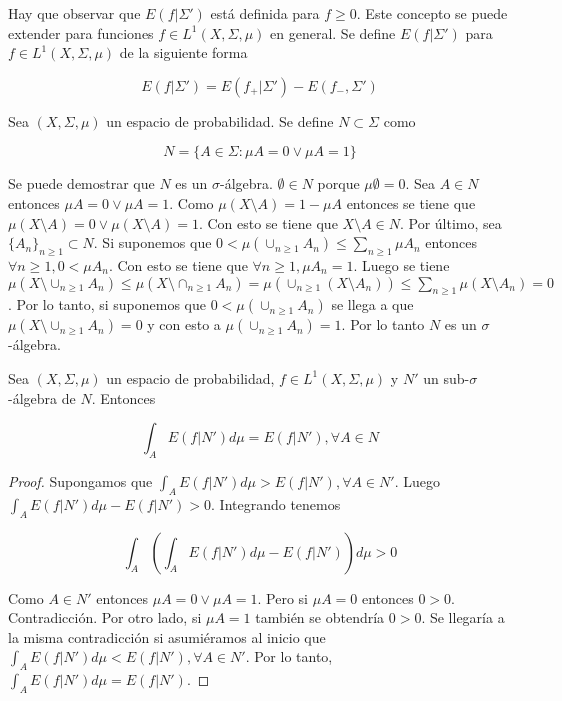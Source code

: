Hay que observar que $E(f|\Sigma')$ está definida para $f \geq 0$. Este concepto se puede extender para funciones $f \in L^1(X,\Sigma,\mu)$ en general. Se define $E(f|\Sigma')$ para $f \in L^1(X,\Sigma,\mu)$ de la siguiente forma

\begin{equation}
	E(f|\Sigma') = E(f_+|\Sigma')- E(f_-,\Sigma')
\end{equation}

\begin{definicion}\label{trivial_sigma-algebra}
	Sea $(X,\Sigma,\mu)$ un espacio de probabilidad. Se define $N \subset \Sigma$ como
	
	\begin{equation}
	N = \{ A \in \Sigma: \mu A = 0 \vee \mu A = 1 \}
	\end{equation}
\end{definicion}

Se puede demostrar que $N$ es un $\sigma$-álgebra. $\emptyset \in N$ porque $\mu \emptyset = 0$. Sea $A \in N$ entonces $\mu A = 0 \vee \mu A = 1$. Como $\mu(X \setminus A) = 1 - \mu A$ entonces se tiene que $\mu(X \setminus A) = 0 \vee \mu(X \setminus A) = 1$. Con esto se tiene que $X \setminus A \in N$. Por último, sea $\{A_n\}_{n \geq 1} \subset N$.  Si suponemos que $0 < \mu(\cup_{n \geq 1} A_n) \leq \sum_{n \geq 1} \mu A_n$ entonces $\forall n \geq 1, 0 < \mu A_n$. Con esto se tiene que $\forall n \geq 1, \mu A_n = 1$. Luego se tiene $\mu(X \setminus \cup_{n \geq 1} A_n) \leq \mu(X \setminus \cap_{n \geq 1} A_n) = \mu(\cup_{n \geq 1} (X \setminus A_n)) \leq \sum_{n \geq 1} \mu(X \setminus A_n) = 0$. Por lo tanto, si suponemos que $0 < \mu(\cup_{n \geq 1} A_n)$  se llega a que $\mu(X \setminus \cup_{n \geq 1} A_n) = 0$ y con esto a $\mu(\cup_{n \geq 1} A_n) = 1$. Por lo tanto $N$ es un $\sigma$-álgebra.

\begin{propiedad}\label{esperanza_en_sigma-algebra_trivial}
	Sea $(X,\Sigma,\mu)$ un espacio de probabilidad, $f \in L^1(X,\Sigma,\mu)$ y $N'$ un sub-$\sigma$-álgebra de $N$. Entonces
	
	\begin{equation}
	\int_A E(f|N') d\mu = E(f|N'), \forall A \in N
	\end{equation}
\end{propiedad}

\begin{proof}
	Supongamos que $\int_A E(f|N') d\mu > E(f|N'), \forall A \in N'$. Luego $\int_A E(f|N') d\mu - E(f|N') > 0$. Integrando tenemos
	
	\begin{equation}
	\int_A \left( \int_A E(f|N')d\mu - E(f|N') \right) d\mu > 0
	\end{equation}
	
	Como $A \in N'$ entonces $\mu A = 0 \vee \mu A = 1$. Pero si $\mu A = 0$ entonces $0>0$. Contradicción. Por otro lado, si $\mu A = 1$ también se obtendría $0>0$. Se llegaría a la misma contradicción si asumiéramos al inicio que $\int_A E(f|N') d\mu < E(f|N'), \forall A \in N'$. Por lo tanto, $\int_A E(f|N') d\mu = E(f|N')$.
\end{proof}